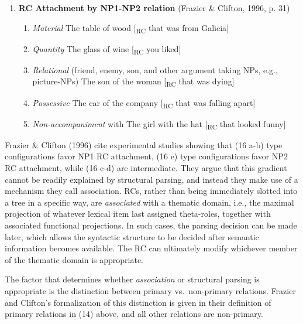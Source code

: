 \documentclass[11pt,oneside]{book}
\providecommand{\tightlist}{%
  \setlength{\itemsep}{0pt}\setlength{\parskip}{0pt}}
\begin{document}
\begin{enumerate}
\def\labelenumi{(\arabic{enumi})}
\setcounter{enumi}{15}
\tightlist
\item
  \textbf{RC Attachment by NP1-NP2 relation} (Frazier \& Clifton, 1996, p. 31)

  \begin{enumerate}
  \def\labelenumii{\alph{enumii}.}
  \tightlist
  \item
    \emph{Material} \linebreak\nopagebreak
    The table of wood {[}\textsubscript{RC} that was from Galicia{]}
  \item
    \emph{Quantity} \linebreak\nopagebreak
    The glass of wine {[}\textsubscript{RC} you liked{]}
  \item
    \emph{Relational} (friend, enemy, son, and other argument taking NPs, e.g., picture-NPs) \linebreak\nopagebreak
    The son of the woman {[}\textsubscript{RC} that was dying{]}
  \item
    \emph{Possessive} \linebreak\nopagebreak
    The car of the company {[}\textsubscript{RC} that was falling apart{]}
  \item
    \emph{Non-accompaniment} with \linebreak\nopagebreak
    The girl with the hat {[}\textsubscript{RC} that looked funny{]}
  \end{enumerate}
\end{enumerate}

Frazier \& Clifton (1996) cite experimental studies showing that (16 a-b) type configurations favor NP1 RC attachment, (16 e) type configurations favor NP2 RC attachment, while (16 c-d) are intermediate. They argue that this gradient cannot be readily explained by structural parsing, and instead they make use of a mechanism they call association. RCs, rather than being immediately slotted into a tree in a specific way, are \emph{associated} with a thematic domain, i.e., the maximal projection of whatever lexical item last assigned theta-roles, together with associated functional projections. In such cases, the parsing decision can be made later, which allows the syntactic structure to be decided after semantic information becomes available. The RC can ultimately modify whichever member of the thematic domain is appropriate.

The factor that determines whether \emph{association} or structural parsing is appropriate is the distinction between primary vs.~non-primary relations. Frazier and Clifton's formalization of this distinction is given in their definition of primary relations in (14) above, and all other relations are non-primary.
\end{document}

